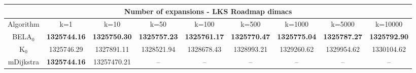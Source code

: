 \begin{tabular}{c|cccccccc}\toprule
\multicolumn{9}{c}{Number of expansions - LKS Roadmap dimacs}\\ \midrule
Algorithm & k=1 & k=10 & k=50 & k=100 & k=500 & k=1000 & k=5000 & k=10000 \\ \midrule
BELA$_0$ & \textbf{1325744.16} & \textbf{1325750.30} & \textbf{1325757.23} & \textbf{1325761.17} & \textbf{1325770.47} & \textbf{1325775.04} & \textbf{1325787.27} & \textbf{1325792.90} \\
K$_0$ & 1325746.29 & 1327891.11 & 1328521.94 & 1328678.43 & 1328993.21 & 1329260.62 & 1329954.62 & 1330104.62 \\
mDijkstra & \textbf{1325744.16} & 13257470.21 & -- & -- & -- & -- & -- & -- \\ \bottomrule 
\end{tabular}
